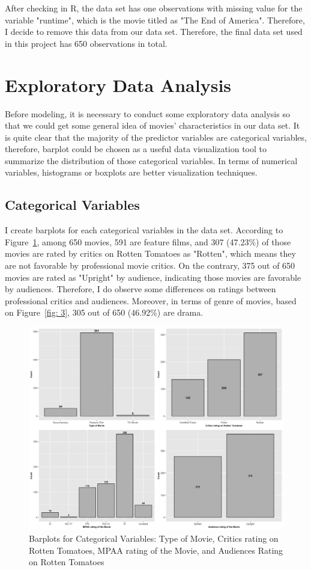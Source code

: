 \documentclass{article}
\begin{document}
After checking in R, the data set has one observations with missing value for the 
variable "runtime", which is the movie titled as "The End of America". Therefore, I 
decide to remove this data from our data set. Therefore, the final data set used in 
this project has 650 observations in total.

\newpage
\section{Exploratory Data Analysis}
Before modeling, it is necessary to conduct some exploratory data analysis so that we could get some general idea of movies' characteristics in our data set. It is quite clear that the majority of the predictor variables are categorical variables, therefore, barplot could be chosen as a useful data visualization tool to summarize the distribution of those categorical variables. In terms of numerical variables, histograms or boxplots are better visualization techniques.

\subsection{Categorical Variables}
I create barplots for each categorical variables in the data set. According to Figure~\ref{fig: 2}, among 650 movies, 591 are feature films, and 307 (47.23\%) of those movies are rated by critics on Rotten Tomatoes as "Rotten", which means they are not favorable by professional movie critics. On the contrary, 375 out of 650 movies are rated as "Upright" by audience, indicating those movies are favorable by audiences. Therefore, I do observe some differences on ratings between professional critics and audiences. Moreover, in terms of genre of movies, based on Figure~\ref{fig: 3}, 305 out of 650 (46.92\%) are drama. 

\begin{figure}[htbp]
\begin{center}
\includegraphics[scale=0.20]{eda_1.png}
\caption{Barplots for Categorical Variables: Type of Movie, Critics rating on Rotten Tomatoes, MPAA rating of the Movie, and Audiences Rating on Rotten Tomatoes}
\label{fig: 2}
\end{center}
\end{figure}
\end{document}
